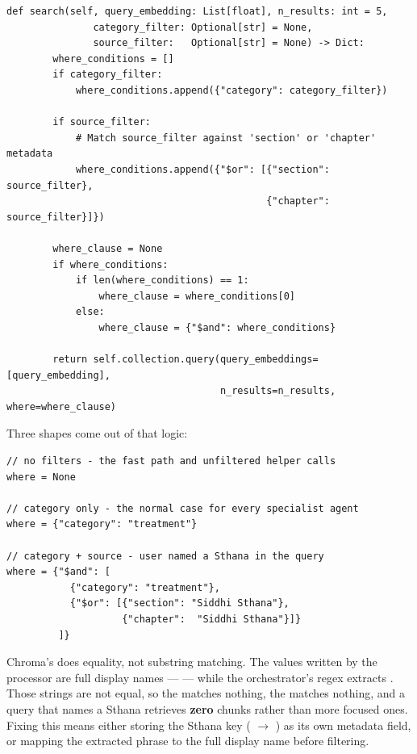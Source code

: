 \begin{lstlisting}[style=py,firstnumber=32]
    def search(self, query_embedding: List[float], n_results: int = 5,
               category_filter: Optional[str] = None,
               source_filter:   Optional[str] = None) -> Dict:
        where_conditions = []
        if category_filter:
            where_conditions.append({"category": category_filter})

        if source_filter:
            # Match source_filter against 'section' or 'chapter' metadata
            where_conditions.append({"$or": [{"section": source_filter},
                                             {"chapter":  source_filter}]})

        where_clause = None
        if where_conditions:
            if len(where_conditions) == 1:
                where_clause = where_conditions[0]
            else:
                where_clause = {"$and": where_conditions}

        return self.collection.query(query_embeddings=[query_embedding],
                                     n_results=n_results, where=where_clause)
\end{lstlisting}

Three shapes come out of that logic:

\begin{lstlisting}[style=json]
// no filters - the fast path and unfiltered helper calls
where = None

// category only - the normal case for every specialist agent
where = {"category": "treatment"}

// category + source - user named a Sthana in the query
where = {"$and": [
           {"category": "treatment"},
           {"$or": [{"section": "Siddhi Sthana"},
                    {"chapter":  "Siddhi Sthana"}]}
         ]}
\end{lstlisting}

\begin{bug}[title={The source filter needs an exact string match}]
Chroma's  does equality, not substring matching. The  values written by the processor are full display names ---  --- while the orchestrator's regex extracts . Those strings are not equal, so the  matches nothing, the  matches nothing, and a query that names a Sthana retrieves \textbf{zero} chunks rather than more focused ones. Fixing this means either storing the Sthana key ( $\rightarrow$ ) as its own metadata field, or mapping the extracted phrase to the full display name before filtering.
\end{bug}

